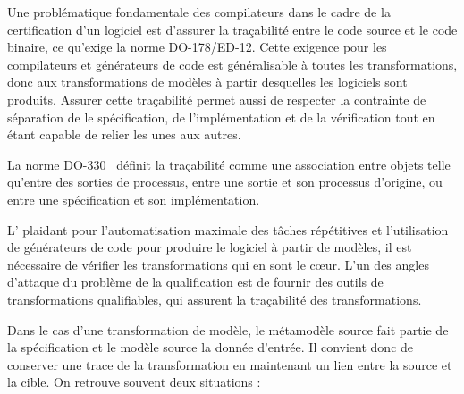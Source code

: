 

Une problématique fondamentale des compilateurs dans le cadre de la
certification d'un logiciel est d'assurer la traçabilité entre le code source
et le code binaire, ce qu'exige la norme DO-178/ED-12. Cette exigence pour les
compilateurs et générateurs de code est généralisable à toutes les
transformations, donc aux transformations de modèles à partir desquelles les
logiciels sont produits. Assurer cette traçabilité permet aussi de respecter la
contrainte de séparation de le spécification, de l'implémentation et de la
vérification tout en étant capable de relier les unes aux autres.


\begin{definition}[Traçabilité]
  La norme DO-330~\cite{DO-330} définit la traçabilité comme une association
  entre objets telle qu'entre des sorties de processus, entre une sortie et son
  processus d'origine, ou entre une spécification et son implémentation.
\end{definition}

L'{\idm} plaidant pour l'automatisation maximale des tâches répétitives et
l'utilisation de générateurs de code pour produire le logiciel à partir de
modèles, il est nécessaire de vérifier les transformations qui en sont le cœur.
L'un des angles d'attaque du problème de la qualification est de fournir des
outils de transformations qualifiables, qui assurent la traçabilité des
transformations. 

Dans le cas d'une transformation de modèle, le métamodèle source fait partie de
la spécification et le modèle source la donnée d'entrée. Il convient donc de
conserver une trace de la transformation en maintenant un lien entre la source
et la cible. On retrouve souvent deux situations :

